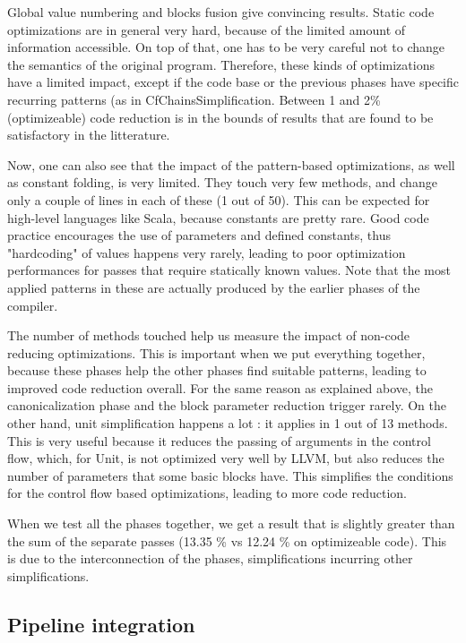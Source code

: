 \documentclass[12pt,a4paper]{article}
\newcommand{\scala}[1]{\textsf{#1}}
\newcommand{\perf}[1]{#1 \%}
\begin{document}
Global value numbering and blocks fusion give convincing results. Static code optimizations are in general very hard, because of the limited amount of information accessible. On top of that, one has to be very careful not to change the semantics of the original program. Therefore, these kinds of optimizations have a limited impact, except if the code base or the previous phases have specific recurring patterns (as in \scala{CfChainsSimplification}. Between 1 and 2\% (optimizeable) code reduction is in the bounds of results that are found to be satisfactory in the litterature.

Now, one can also see that the impact of the pattern-based optimizations, as well as constant folding, is very limited. They touch very few methods, and change only a couple of lines in each of these (1 out of 50). This can be expected for high-level languages like Scala, because constants are pretty rare. Good code practice encourages the use of parameters and defined constants, thus "hardcoding" of values happens very rarely, leading to poor optimization performances for passes that require statically known values. Note that the most applied patterns in these are actually produced by the earlier phases of the compiler.

The number of methods touched help us measure the impact of non-code reducing optimizations. This is important when we put everything together, because these phases help the other phases find suitable patterns, leading to improved code reduction overall.  For the same reason as explained above, the canonicalization phase and the block parameter reduction trigger rarely. On the other hand, unit simplification happens a lot : it applies in 1 out of 13 methods. This is very useful because it reduces the passing of arguments in the control flow, which, for \scala{Unit}, is not optimized very well by LLVM, but also reduces the number of parameters that some basic blocks have. This simplifies the conditions for the control flow based optimizations, leading to more code reduction.

When we test all the phases together, we get a result that is slightly greater than the sum of the separate passes (\perf{13.35} vs \perf{12.24} on optimizeable code). This is due to the interconnection of the phases, simplifications incurring other simplifications.


\subsection{Pipeline integration}
\end{document}
